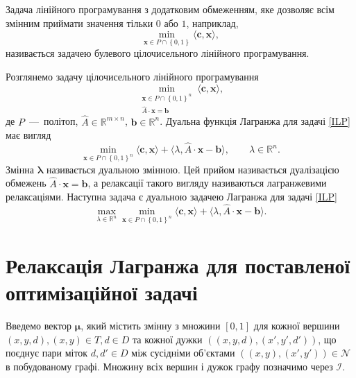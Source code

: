 Задача лінійного програмування з додатковим обмеженням,
яке дозволяє всім змінним приймати значення тільки $0$ або $1$,
наприклад,
\begin{equation*}
    \min \limits_{\pmb{x} \in P \cap \left\{ 0, 1 \right\}}
    \langle \pmb{c}, \pmb{x} \rangle,
\end{equation*}
називається задачею булевого цілочисельного лінійного програмування.

Розглянемо задачу цілочисельного лінійного програмування
\begin{equation} \label{ILP}
    \min \limits_{\substack{\pmb{x} \in P \cap \left\{ 0, 1\right\}^n \\
                  \hat{A} \cdot \pmb{x} = \pmb{b}}}
        \langle \pmb{c}, \pmb{x} \rangle,
\end{equation}
де $P$~---~політоп, $\hat{A} \in \mathbb{R}^{m \times n}$,
$\pmb{b} \in \mathbb{R}^n$.
Дуальна функція Лагранжа для задачі \eqref{ILP} має вигляд
\begin{equation} \label{dualization}
    \min \limits_{\pmb{x} \in P \cap \left\{ 0, 1 \right\}^n}
        \langle \pmb{c}, \pmb{x} \rangle +
    \langle \lambda, \hat{A} \cdot \pmb{x} - \pmb{b} \rangle, \qquad
    \lambda \in \mathbb{R}^n.
\end{equation}
Змінна $\pmb{\lambda}$ називається дуальною змінною.
Цей прийом називається дуалізацією обмежень $\hat{A} \cdot \pmb{x} = \pmb{b}$,
а релаксації такого вигляду називаються лагранжевими релаксаціями.
Наступна задача є дуальною задачею Лагранжа для задачі \eqref{ILP}
\begin{equation*}
    \max \limits_{\lambda \in \mathbb{R}^n}
        \min \limits_{\pmb{x} \in P \cap \left\{ 0, 1 \right\}^n}
            \langle \pmb{c}, \pmb{x} \rangle +
        \langle \lambda, \hat{A} \cdot \pmb{x} - \pmb{b} \rangle.
\end{equation*}

\section{Релаксація Лагранжа для поставленої оптимізаційної задачі}

Введемо вектор $\pmb{\mu}$, який містить змінну з множини $ \left[ 0, 1 \right]$
для кожної вершини
$\left( x, y, d \right), \left(x, y \right) \in T, d \in D$ та кожної дужки
$\left( \left( x, y, d \right), \left(x', y', d' \right) \right)$,
що поєднує пари міток $d, d' \in D$ між сусідніми об'єктами
$\left(\left(x, y \right), \left(x', y' \right) \right) \in \mathcal{N}$
в побудованому графі.
Множину всіх вершин і дужок графу позначимо через $\mathcal{I}$.

